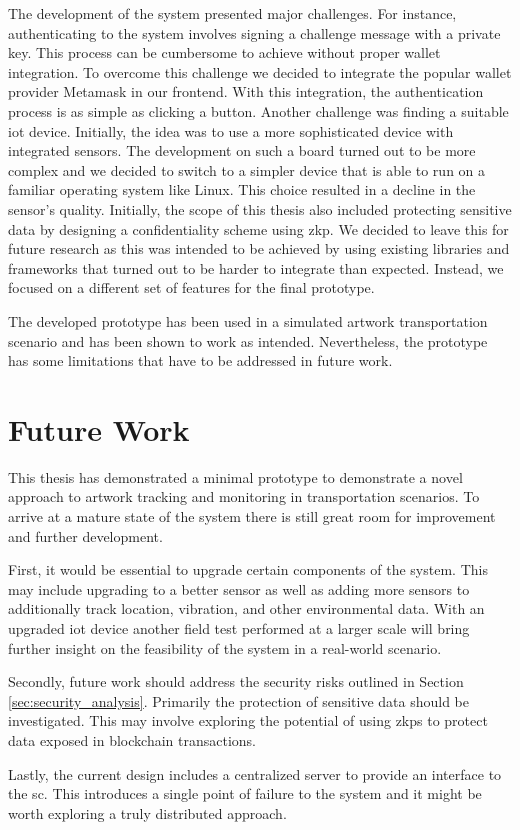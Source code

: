 The development of the system presented major challenges. For instance, authenticating to the system involves signing a challenge message with a private key. This process can be cumbersome to achieve without proper wallet integration. To overcome this challenge we decided to integrate the popular wallet provider Metamask in our frontend. With this integration, the authentication process is as simple as clicking a button. Another challenge was finding a suitable \gls{iot} device. Initially, the idea was to use a more sophisticated device with integrated sensors. The development on such a board turned out to be more complex and we decided to switch to a simpler device that is able to run on a familiar operating system like Linux. This choice resulted in a decline in the sensor's quality. Initially, the scope of this thesis also included protecting sensitive data by designing a confidentiality scheme using \gls{zkp}. We decided to leave this for future research as this was intended to be achieved by using existing libraries and frameworks that turned out to be harder to integrate than expected. Instead, we focused on a different set of features for the final prototype.

The developed prototype has been used in a simulated artwork transportation scenario and has been shown to work as intended. Nevertheless, the prototype has some limitations that have to be addressed in future work.

\section{Future Work}
This thesis has demonstrated a minimal prototype to demonstrate a novel approach to artwork tracking and monitoring in transportation scenarios. To arrive at a mature state of the system there is still great room for improvement and further development.

First, it would be essential to upgrade certain components of the system. This may include upgrading to a better sensor as well as adding more sensors to additionally track location, vibration, and other environmental data. With an upgraded \gls{iot} device another field test performed at a larger scale will bring further insight on the feasibility of the system in a real-world scenario.

Secondly, future work should address the security risks outlined in Section \ref{sec:security_analysis}. Primarily the protection of sensitive data should be investigated. This may involve exploring the potential of using \glspl{zkp} to protect data exposed in blockchain transactions.

Lastly, the current design includes a centralized server to provide an interface to the \gls{sc}. This introduces a single point of failure to the system and it might be worth exploring a truly distributed approach. 